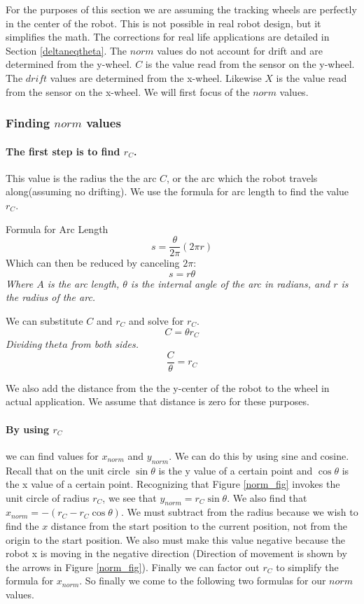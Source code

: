 \documentclass[12pt]{article}
\begin{document}
For the purposes of this section we are assuming the tracking wheels are perfectly in the center of the robot. This is not possible in real robot design, but it simplifies the math. The corrections for real life applications are detailed in Section \ref{deltaneqtheta}. The $norm$ values do not account for drift and are determined from the y-wheel. $C$ is the value read from the sensor on the y-wheel. The $drift$ values are determined from the x-wheel. Likewise $X$ is the value read from the sensor on the x-wheel. We will first focus of the $norm$ values.
\subsubsection{Finding $norm$ values}
\paragraph{The first step is to find $r_C$.} This value is the radius the the arc $C$, or the arc which the robot travels along(assuming no drifting). We use the formula for arc length to find the value $r_C$.

\centering
Formula for Arc Length
$$ s = \frac{\theta}{2\pi} (2\pi r) $$
Which can then be reduced by canceling $2\pi$:
$$ s = r\theta $$
\textit{Where $A$ is the arc length, $\theta$ is the internal angle of the arc in radians, and $r$ is the radius of the arc.}

We can substitute $C$ and $r_C$ and solve for $r_C$.
$$ C = \theta r_C $$
\textit{Dividing $theta$ from both sides.}
$$ \frac{C}{\theta} = r_C $$

\raggedright
We also add the distance from the the y-center of the robot to the wheel in actual application. We assume that distance is zero for these purposes.

\paragraph{By using $r_C$} we can find values for $x_{norm}$ and $y_{norm}$. We can do this by using sine and cosine. Recall that on the unit circle $\sin\theta$ is the y value of a certain point and $\cos\theta$ is the x value of a certain point. Recognizing that Figure \ref{norm_fig} invokes the unit circle of radius $r_C$, we see that $y_{norm} = r_C \sin\theta$. We also find that $x_{norm} = -(r_C - r_C \cos\theta)$. We must subtract from the radius because we wish to find the $x$ distance from the start position to the current position, not from the origin to the start position. We also must make this value negative because the robot x is moving in the negative direction (Direction of movement is shown by the arrows in Figure \ref{norm_fig}). Finally we can factor out $r_C$ to simplify the formula for $x_{norm}$. So finally we come to the following two formulas for our $norm$ values.
\end{document}
